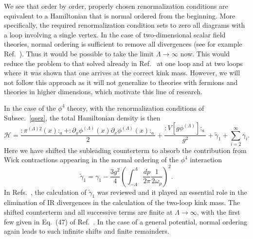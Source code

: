 \def\letter{0}\def\pr{0}\documentclass[a4paper,12pt, epsfig]{article}
\def\blu#1{\textcolor{blue}{Jarah: #1}}
\renewcommand{\(}{\begin{equation}}
\renewcommand{\)}{end{equation} \vspace{-.05in}\linebreak}
\renewcommand{\=}{\hspace{-.03in}=\hspace{-.02in}}
\renewcommand{\(}{\begin{equation}}
\renewcommand{\)}{\end{equation}}
\renewcommand{\(}{\begin{equation}}
\renewcommand{\)}{\end{equation}}
\def\lpin#1{\int^\Lambda_{-\Lambda} \frac{d#1}{2\pi}}
\renewcommand{\L}{{(\Lambda)}}
\def\mh{\mathcal{H}}
\newcommand{\beq}{\begin{equation}}
\newcommand{\eeq}{\end{equation}}
\begin{document}
We see that order by order, properly chosen renormalization conditions are equivalent to a Hamiltonian that is normal ordered from the beginning.  More specifically, the required renormalization condition sets to zero all diagrams with a loop involving a single vertex. In the case of two-dimensional scalar field theories, normal ordering is sufficient to remove all divergences (see for example Ref.~\cite{colemansg}).  Thus it would be possible to take the limit $\Lambda\rightarrow\infty$ now.  This would reduce the problem to that solved already in Ref.~\cite{mekink,memassa} at one loop and \cite{dueloop} at two loops where it was shown that one arrives at the correct kink mass.  However, we will not follow this approach as it will not generalize to theories with fermions and theories in higher dimensions, which motivate this line of research.

In the case of the $\phi^4$ theory, with the renormalization conditions of Subsec.~\ref{qsez},  the total Hamiltonian density is then
\begin{equation}
\mh=\frac{:\pi^{\L 2}(x):_a+:\partial_x {\phi}^\L (x)\partial_x {\phi}^\L (x):_a}{2}+\frac{:{V}[g{\phi}^\L]:_a}{g^2} + \tilde{\gamma}_1+\sum_{i=2}^{\infty}\gamma_{i}. \label{rh}
\end{equation}
Here we have shifted the subleading counterterm to absorb the contribution from Wick contractions appearing in the normal ordering of the $\phi^4$ interaction %
\beq
\tilde{\gamma}_1=\gamma_1-\frac{3g^2}{4}\left(\lpin{p}\frac{1}{2\omega_p}\right)^2.
\eeq
In Refs.~\cite{phi42loop,phi42loop2}, the calculation of $\tilde{\gamma}_1$ was reviewed and it played an essential role in the elimination of IR divergences in the calculation of the two-loop kink mass.  The shifted counterterm and all successive terms are finite at $\Lambda\rightarrow\infty$, with the first few given in Eq.~(47) of Ref.~\cite{serone}.  In the case of a general potential, normal ordering again leads to such infinite shifts and finite remainders.
\end{document}
